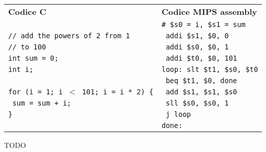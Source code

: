\documentclass[../main.tex]{subfiles}
\begin{document}
\noindent
\begin{tabular}{ p{7cm} p{7cm} }
    \textbf{Codice C} & \textbf{Codice MIPS assembly} \\
    & \texttt{\# \$s0 = i, \$s1 = sum} \\
    \texttt{// add the powers of 2 from 1} & \texttt{ \hspace{0cm} \hspace{0cm} \hspace{0cm} \hspace{0cm} \hspace{0cm} \hspace{0cm} addi \$s1, \$0, 0} \\
    \texttt{// to 100} & \texttt{ \hspace{0cm} \hspace{0cm} \hspace{0cm} \hspace{0cm} \hspace{0cm} \hspace{0cm} addi \$s0, \$0, 1} \\
    \texttt{int sum = 0;} & \texttt{ \hspace{0cm} \hspace{0cm} \hspace{0cm} \hspace{0cm} \hspace{0cm} \hspace{0cm}  addi \$t0, \$0, 101} \\
    \texttt{int i;} & \texttt{loop: slt \$t1, \$s0, \$t0} \\
    & \texttt{ \hspace{0cm} \hspace{0cm} \hspace{0cm} \hspace{0cm} \hspace{0cm} \hspace{0cm} beq \$t1, \$0, done} \\
    \texttt{for (i = 1; i $<$ 101; i = i * 2) \{} & \texttt{ \hspace{0cm} \hspace{0cm} \hspace{0cm} \hspace{0cm} \hspace{0cm} \hspace{0cm} add \$s1, \$s1, \$s0} \\
    \texttt{ \hspace{0cm} sum = sum + i;} & \texttt{ \hspace{0cm} \hspace{0cm} \hspace{0cm} \hspace{0cm} \hspace{0cm} \hspace{0cm} sll \$s0, \$s0, 1} \\
    \texttt{\}} & \texttt{ \hspace{0cm} \hspace{0cm} \hspace{0cm} \hspace{0cm} \hspace{0cm} \hspace{0cm} j loop} \\
    & \texttt{done:} \\
\end{tabular}

TODO
\end{document}
